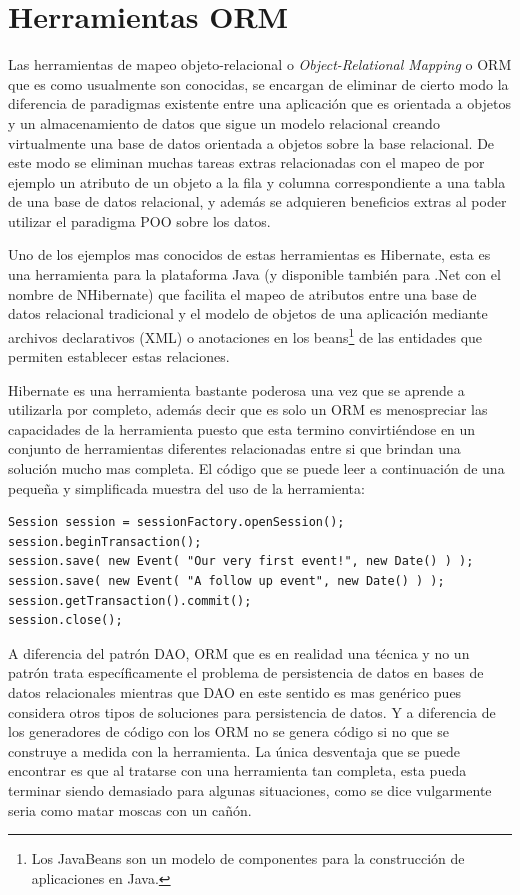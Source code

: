 \section{Herramientas ORM}
%
Las herramientas de mapeo objeto-relacional o \textit{Object-Relational Mapping} o ORM que es como usualmente son conocidas, se encargan de eliminar de cierto modo la diferencia de paradigmas existente entre una aplicación que es orientada a objetos y un almacenamiento de datos que sigue un modelo relacional creando virtualmente una base de datos orientada a objetos sobre la base relacional. De este modo se eliminan muchas tareas extras relacionadas con el mapeo de por ejemplo un atributo de un objeto a la fila y columna correspondiente a una tabla de una base de datos relacional, y además se adquieren beneficios extras al poder utilizar el paradigma POO sobre los datos.

Uno de los ejemplos mas conocidos de estas herramientas es Hibernate, esta es una herramienta para la plataforma Java (y disponible también para .Net con el nombre de NHibernate) que facilita el mapeo de atributos entre una base de datos relacional tradicional y el modelo de objetos de una aplicación mediante archivos declarativos (XML) o anotaciones en los beans\footnote{Los JavaBeans son un modelo de componentes para la construcción de aplicaciones en Java.} de las entidades que permiten establecer estas relaciones. 

Hibernate es una herramienta bastante poderosa una vez que se aprende a utilizarla por completo, además decir que es solo un ORM es menospreciar las capacidades de la herramienta puesto que esta termino convirtiéndose en un conjunto de herramientas diferentes relacionadas entre si que brindan una solución mucho mas completa. El código que se puede leer a continuación de una pequeña y simplificada muestra del uso de la herramienta:
\begin{lstlisting}[title=Minimo ejemplo de Hibernate: guardando datos en la DB]
Session session = sessionFactory.openSession();
session.beginTransaction();
session.save( new Event( "Our very first event!", new Date() ) );
session.save( new Event( "A follow up event", new Date() ) );
session.getTransaction().commit();
session.close();
\end{lstlisting}
A diferencia del patrón DAO, ORM que es en realidad una técnica y no un patrón trata específicamente el problema de persistencia de datos en bases de datos relacionales mientras que DAO en este sentido es mas genérico pues considera otros tipos de soluciones para persistencia de datos. Y a diferencia de los generadores de código con los ORM no se genera código si no que se construye a medida con la herramienta. La única desventaja que se puede encontrar es que al tratarse con una herramienta tan completa, esta pueda terminar siendo demasiado para algunas situaciones, como se dice vulgarmente seria como matar moscas con un cañón.
%
